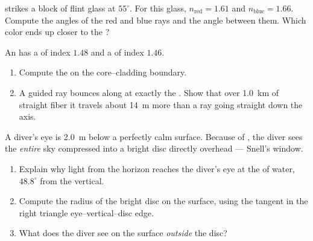\begin{exercise}[$\star\star$]\label{exo:g10:refraction:10}
 strikes a block of flint glass at $55^\circ$. For this
glass, $n_{\text{red}} = 1.61$ and $n_{\text{blue}} = 1.66$. Compute the
 angles of the red and blue rays and the angle between them.
Which color ends up closer to the ?
\end{exercise}

\begin{exercise}[$\star\star$]\label{exo:g10:refraction:11}
An  has a  of index $1.48$ and a  of index
$1.46$.
\begin{enumerate}
  \item Compute the  on the core--cladding boundary.
  \item A guided ray bounces along at exactly the . Show
        that over \qty{1.0}{km} of straight fiber it travels about
        \qty{14}{m} more than a ray going straight down the axis.
\end{enumerate}
\end{exercise}

\begin{exercise}[$\star\star\star$]\label{exo:g10:refraction:12}
A diver's eye is \qty{2.0}{m} below a perfectly calm surface. Because of
, the diver sees the \emph{entire} sky compressed into a
bright disc directly overhead --- Snell's window.
\begin{enumerate}
  \item Explain why light from the horizon reaches the diver's eye at
        the  of water, $48.8^\circ$ from the vertical.
  \item Compute the radius of the bright disc on the surface, using the
        tangent in the right triangle eye--vertical--disc edge.
  \item What does the diver see on the surface \emph{outside} the disc?
\end{enumerate}
\end{exercise}

